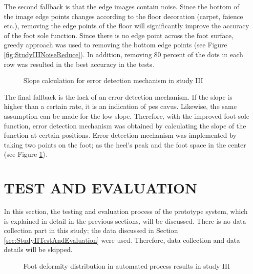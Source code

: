 The second fallback is that the edge images contain noise. Since the bottom of the image edge points changes according to the floor decoration (carpet, faience etc.), removing the edge points of the floor will significantly improve the accuracy of the foot sole function. Since there is no edge point across the foot surface, greedy approach was used to removing the bottom edge points (see Figure \ref{fig:StudyIIINoiseReduce}). In addition, removing 80 percent of the dots in each row was resulted in the best accuracy in the tests.

\begin{figure}[htbp]
\centering
{}
\caption{Slope calculation for error detection mechanism  in study III}
\label{fig:StudyIIISlopeCalculation}
\end{figure}

The final fallback is the lack of an error detection mechanism. If the slope is higher than a certain rate, it is an indication of pes cavus. Likewise, the same assumption can be made for the low slope. Therefore, with the improved foot sole function, error detection mechanism was obtained by calculating the slope of the function at certain positions. Error detection mechanism was implemented by taking two points on the foot; as the heel's peak and the foot space in the center (see Figure \ref{fig:StudyIIISlopeCalculation}).

\section{TEST AND EVALUATION}\label{sec:StudyIIITestAndEvaluation}

In this section, the testing and evaluation process of the prototype system, which is explained in detail in the previous sections, will be discussed. There is no data collection part in this study; the data discussed in Section \ref{sec:StudyIITestAndEvaluation} were used. Therefore, data collection and data details will be skipped.

\begin{figure}[htbp]
\centering
{}
\caption{Foot deformity distribution in automated process results in study III}
\label{fig:StudyIIIFootDeformityAutomatedProcessResults}
\end{figure} 

